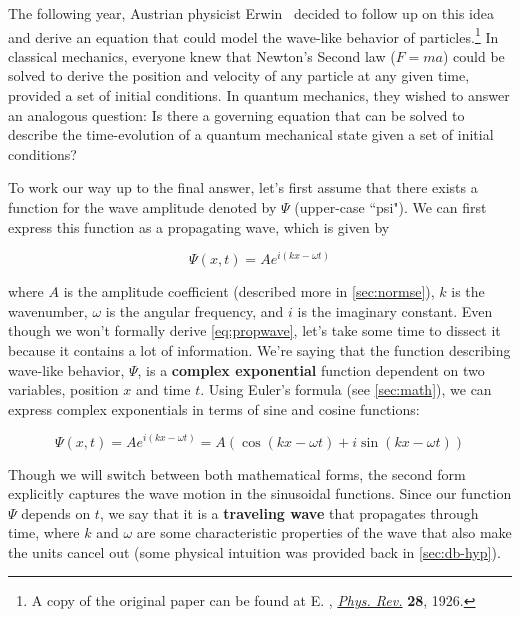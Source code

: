 The following year, Austrian physicist Erwin \Sch\ decided to follow up on this idea and derive an equation that could model the wave-like behavior of particles.\footnote{A copy of the original paper can be found at E. \Sch, \href{https://journals.aps.org/pr/abstract/10.1103/PhysRev.28.1049}{\emph{Phys. Rev.}} \textbf{28}, 1926.} 
In classical mechanics, everyone knew that Newton's Second law ($F=ma$) could be solved to derive the position and velocity of any particle at any given time, provided a set of initial conditions. 
In quantum mechanics, they wished to answer an analogous question: Is there a governing equation that can be solved to describe the time-evolution of a quantum mechanical state given a set of initial conditions? 

To work our way up to the final answer, let's first assume that there exists a function for the wave amplitude denoted by $\Psi$ (upper-case ``psi"). 
We can first express this function as a propagating wave, which is given by

\begin{equation}
	\Psi(x,t) = Ae^{i(kx-\omega t)} \label{eq:propwave}
\end{equation}

\noindent where $A$ is the amplitude coefficient (described more in  \autoref{sec:normse}), $k$ is the wavenumber, $\omega$ is the angular frequency, and $i$ is the imaginary constant. 
Even though we won't formally derive \autoref{eq:propwave}, let's take some time to dissect it because it contains a lot of information. 
We're saying that the function describing wave-like behavior, $\Psi$, is a \textbf{complex exponential} function dependent on two variables, position $x$ and time $t$. 
Using Euler's formula (see \autoref{sec:math}), we can express complex exponentials in terms of sine and cosine functions:

\begin{equation*}
	\Psi(x,t) = Ae^{i(kx-\omega t)} = A\left(\cos(kx-\omega t) + i\sin(kx-\omega t)\right)
\end{equation*}

Though we will switch between both mathematical forms, the second form explicitly captures the wave motion in the sinusoidal functions. 
Since our function $\Psi$ depends on $t$, we say that it is a \textbf{traveling wave} that propagates through time, where $k$ and $\omega$ are some characteristic properties of the wave that also make the units cancel out (some physical intuition was provided back in \autoref{sec:db-hyp}). 

